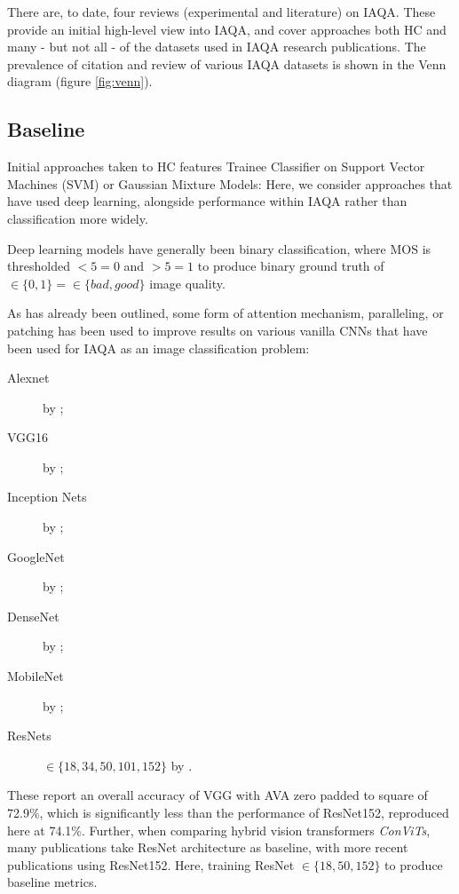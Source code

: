 There are, to date, four reviews (experimental and literature) on IAQA\cite{Yang2019, Kanwal2021, Deng2017,Spathis2016}. These provide an initial high-level view into IAQA, and cover approaches both HC and many - but not all - of the datasets used in IAQA research publications. The prevalence of citation and review of various IAQA datasets is shown in the Venn diagram (figure \ref{fig:venn}). 


\subsection{Baseline}
\label{sec:baseline}

Initial approaches taken to HC features Trainee Classifier on Support Vector Machines (SVM) or Gaussian Mixture Models: Here, we consider approaches that have used deep learning, alongside performance within IAQA rather than classification more widely.

Deep learning models have generally been binary classification, where MOS is thresholded $<5=0$ and $>5=1$ to produce binary ground truth  of $\in \{0,1\} = \in \{bad,good\}$ image quality. 

As has already been outlined, some form of attention mechanism, paralleling, or patching has been used to improve results on various vanilla CNNs that have been used for IAQA as an image classification problem:\begin{description}
    \item[Alexnet]\cite{Krizhevsky2017a} by \cite{Koa2016b};
    \item[VGG16]\cite{Simonyan2015a} by \cite{Ma2017,Deng2017, Mai2016, Hosu2019, Sheng2018,Ma2017,Kong2016,Liu2017,Koa2016b};
    \item[Inception Nets]\cite{Szegedy2016} by \cite{Liu2020a,Talebi2018};
    \item[GoogleNet]\cite{Szegedy2015} by \cite{Jin2019,Hii2017a};
    \item[DenseNet]\cite{Huang2017} by \cite{Liu2020,Liu2020a};
    \item [MobileNet]\cite{Howard2017} by \cite{Talebi2018};
    \item [ResNets]\cite{He2016a} $\in \{18,34,50,101,152\}$ by  \cite{Sheng2018,Kong2016,Koa2016b,She_2021_CVPR,Chen2020b,Liu2020a}. 
\end{description}  

These report an overall accuracy of VGG with AVA zero padded to square of 72.9\%\cite{Ma2017}, which is significantly less than the performance of ResNet152, reproduced here at 74.1\%. Further, when comparing hybrid vision transformers \textit{ConViTs}, many publications take ResNet architecture as baseline\cite{Wu2021,El-Nouby2021a,Khan2021}, with more recent publications using ResNet152\cite{Jin2019}. Here, training ResNet $\in \{18,50,152\}$ to produce baseline metrics. 

